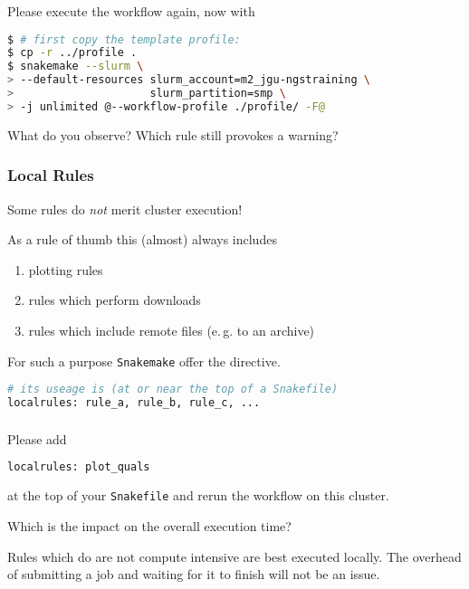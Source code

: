 \begin{frame}[fragile]
  \frametitle{}
  Please execute the workflow again, now with 
  \begin{lstlisting}[language=Bash, style=Shell, basicstyle=\footnotesize]
$ # first copy the template profile:
$ cp -r ../profile .
$ snakemake --slurm \
> --default-resources slurm_account=m2_jgu-ngstraining \
>                     slurm_partition=smp \
> -j unlimited @--workflow-profile ./profile/ -F@
  \end{lstlisting}
  \begin{question}
  	What do you observe? Which rule still provokes a warning?
  \end{question}
\end{frame}

\begin{frame}[fragile]
  \frametitle{Local Rules}
  \begin{hint}[]
  	Some rules do \emph{not} merit cluster execution!
  \end{hint}
  \pause
  As a rule of thumb this (almost) always includes
  \begin{enumerate}
   \item plotting rules
   \item rules which perform downloads
   \item rules which include remote files (e.\,g. to an archive)
  \end{enumerate}
  \pause
  For such a purpose \texttt{Snakemake} offer the  directive.
  \begin{lstlisting}[language=Python,style=Python]
# its useage is (at or near the top of a Snakefile)
localrules: rule_a, rule_b, rule_c, ...
  \end{lstlisting}

\end{frame}

\begin{frame}[fragile]
  \frametitle{}
  Please add
  \begin{lstlisting}[language=Python,style=Python]
localrules: plot_quals
  \end{lstlisting}
  at the top of your \texttt{Snakefile} and rerun the workflow on this cluster.
  \pause
  \begin{question}
  	Which is the impact on the overall execution time?
  \end{question}
  \pause
  \begin{hint}
  	Rules which do are not compute intensive are best executed locally. The overhead of submitting a job and waiting for it to finish will not be an issue.
  \end{hint}
\end{frame}

